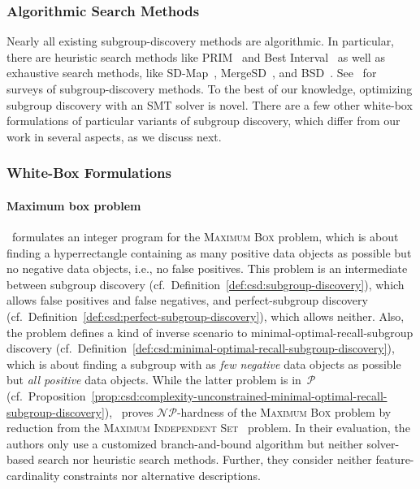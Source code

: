\documentclass{article}
\theoremstyle{definition}
\begin{document}
\subsubsection{Algorithmic Search Methods}
\label{sec:csd:related-work:subgroup-discovery:algorithmic-methods}

Nearly all existing subgroup-discovery methods are algorithmic.
In particular, there are heuristic search methods like PRIM~\cite{friedman1999bump} and Best Interval~\cite{mampaey2012efficient} as well as exhaustive search methods, like SD-Map~\cite{atzmueller2009fast, atzmueller2006sd}, MergeSD~\cite{grosskreutz2009subgroup}, and BSD~\cite{lemmerich2016fast, lemmerich2010fast}.
See~\cite{atzmueller2015subgroup, helal2016subgroup, herrera2011overview, ventura2018subgroup} for surveys of subgroup-discovery methods.
To the best of our knowledge, optimizing subgroup discovery with an SMT solver is novel.
There are a few other white-box formulations of particular variants of subgroup discovery, which differ from our work in several aspects, as we discuss next.

\subsubsection{White-Box Formulations}
\label{sec:csd:related-work:subgroup-discovery:white-box}

\paragraph{Maximum box problem}

\cite{eckstein2002maximum}~formulates an integer program for the \textsc{Maximum Box} problem, which is about finding a hyperrectangle containing as many positive data objects as possible but no negative data objects, i.e., no false positives.
This problem is an intermediate between subgroup discovery (cf.~Definition~\ref{def:csd:subgroup-discovery}), which allows false positives and false negatives, and perfect-subgroup discovery (cf.~Definition~\ref{def:csd:perfect-subgroup-discovery}), which allows neither.
Also, the problem defines a kind of inverse scenario to minimal-optimal-recall-subgroup discovery (cf.~Definition~\ref{def:csd:minimal-optimal-recall-subgroup-discovery}), which is about finding a subgroup with as \emph{few negative} data objects as possible but \emph{all positive} data objects.
While the latter problem is in~$\mathcal{P}$ (cf.~Proposition~\ref{prop:csd:complexity-unconstrained-minimal-optimal-recall-subgroup-discovery}), \cite{eckstein2002maximum}~proves $\mathcal{NP}$-hardness of the \textsc{Maximum Box} problem by reduction from the \textsc{Maximum Independent Set}~\cite{tarjan1977finding} problem.
In their evaluation, the authors only use a customized branch-and-bound algorithm but neither solver-based search nor heuristic search methods.
Further, they consider neither feature-cardinality constraints nor alternative descriptions.
\end{document}
